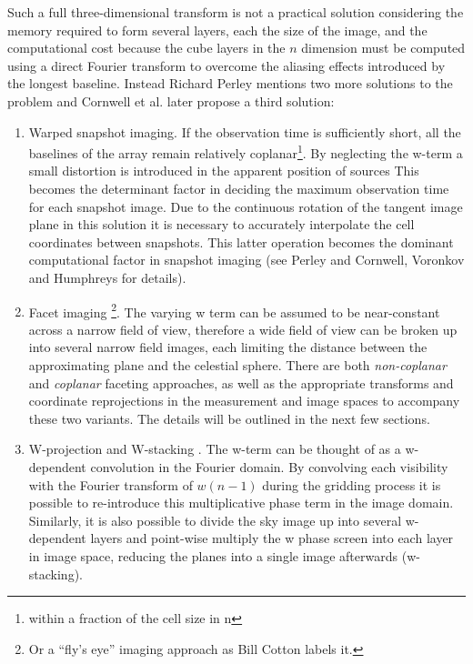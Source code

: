 Such a full three-dimensional transform is not a practical solution considering the memory required to form several layers,
each the size of the image, and the computational cost because the cube layers in the $n$ dimension must be computed using a direct Fourier 
transform to overcome the aliasing effects introduced by the longest baseline. Instead Richard Perley \cite[Lecture 19]{taylor1999synthesis} mentions two more 
solutions to the problem and Cornwell et al. \cite{cornwell2008noncoplanar} later propose a third solution:
\begin{enumerate}
 \item Warped snapshot imaging. If the observation time is sufficiently short, all the baselines of the array remain relatively coplanar\footnote{within a 
 fraction of the cell size in n}. By neglecting the w-term a small distortion is introduced in the apparent position of sources This becomes the determinant
 factor in deciding the maximum observation time for each snapshot image. Due to the continuous rotation of the tangent image plane in this solution it is necessary
 to accurately interpolate the cell coordinates between snapshots. This latter operation becomes the dominant computational factor in snapshot imaging (see Perley \cite[Lecture 19]{taylor1999synthesis}
 and Cornwell, Voronkov and Humphreys \cite{cornwell2012wide} for details).
 \item Facet imaging \footnote{Or a ``fly's eye'' imaging approach as Bill Cotton labels it.}. The varying w term can be assumed to be near-constant across a narrow field of view, therefore a 
 wide field of view can be broken up into several narrow field images, each limiting the distance between the approximating plane and the celestial sphere. There are both \emph{non-coplanar} and \emph{coplanar}
 faceting approaches, as well as the appropriate transforms and coordinate reprojections in the measurement and image spaces to accompany these two variants. The details will be 
 outlined in the next few sections.
 \item W-projection \cite{cornwell2008noncoplanar} and W-stacking \cite{offringa2014wsclean}. The w-term can be thought of as a w-dependent convolution
 in the Fourier domain. By convolving each visibility with the Fourier transform of $w(n-1)$ during the gridding process it is possible to re-introduce 
 this multiplicative phase term in the image domain. Similarly, it is also possible to divide the sky image up into several w-dependent layers and point-wise
 multiply the w phase screen into each layer in image space, reducing the planes into a single image afterwards (w-stacking).
\end{enumerate}

